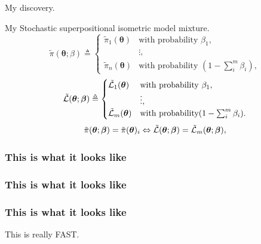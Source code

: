 \documentclass[bigger]{beamer}
\begin{document}
\begin{frame}[label={sec:orgb21b8c0}]{My discovery.}
\begin{block}{My Stochastic superpositional isometric model mixture.}
\begin{equation*}
  \tilde{\pi}(\bm{\theta}; \beta)  \triangleq \begin{cases}
	\tilde{\pi}_{1}(\bm{\theta}) & \text{with probability } \beta_{1},\\
	& \vdots,\\
	\tilde{\pi}_{n}(\bm{\theta}) & \text{with probability } (1- \sum_{i}^{m}\beta_{i}),
	\end{cases}
\end{equation*}
\begin{equation*}
  \tilde{\cal L}(\bm{\theta}; \bm{\beta})  \triangleq
  \begin{cases}
	\tilde{\cal L}_{1}(\bm{\theta}) &  \text{with probability } \beta_{1},\\
		    &\vdots,\\
	\tilde{\cal L}_{m}(\bm{\theta}) & \text{with probability} (1- \sum_{i}^{m}\beta_{i}).
\end{cases}
\end{equation*}
\begin{equation*}
  \tilde{\pi}(\bm{\theta}; \bm{\beta}) = \tilde{\pi}(\bm{\theta})_{i} \Leftrightarrow \tilde{\cal L}(\bm{\theta}; \bm{\beta}) = \tilde{\cal L}_{m}(\bm{\theta}; \bm{\beta}), 
\end{equation*}
\end{block}
\end{frame}

\begin{frame}
  \frametitle{This is what it looks like}
  
\end{frame}

\begin{frame}
  \frametitle{This is what it looks like}

\end{frame}


\begin{frame}
  \frametitle{This is what it looks like}
  
\end{frame}


\begin{frame}[label={sec:orgcde55a9}]{This is really FAST.}
\begin{figure}

\end{figure}
\end{frame}
\end{document}
